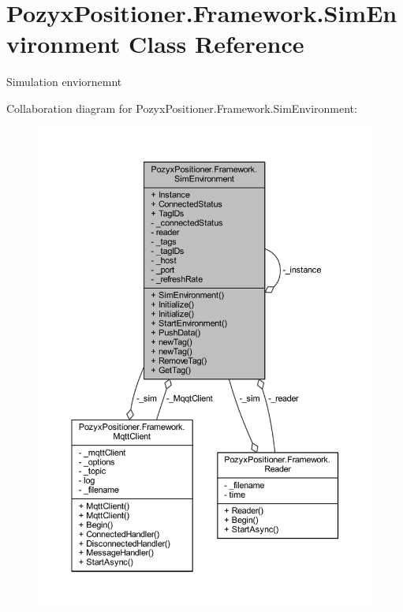 \hypertarget{class_pozyx_positioner_1_1_framework_1_1_sim_environment}{}\section{Pozyx\+Positioner.\+Framework.\+Sim\+Environment Class Reference}
\label{class_pozyx_positioner_1_1_framework_1_1_sim_environment}


Simulation enviornemnt  




Collaboration diagram for Pozyx\+Positioner.\+Framework.\+Sim\+Environment\+:
\nopagebreak
\begin{figure}[H]
\begin{center}
\leavevmode
\includegraphics[width=350pt]{class_pozyx_positioner_1_1_framework_1_1_sim_environment__coll__graph}
\end{center}
\end{figure}
